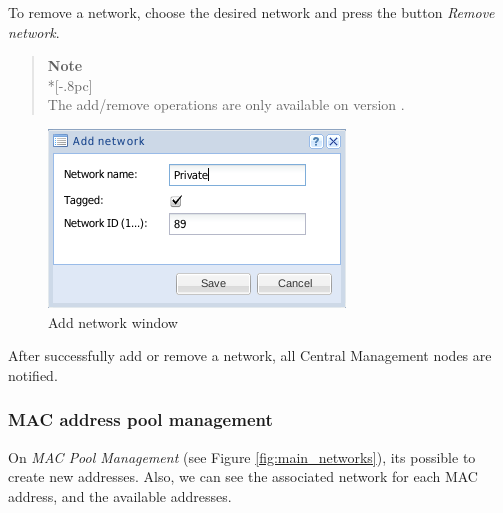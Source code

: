 To remove a network, choose the desired network and press the button \emph{Remove network}. 

\begin{quote}
	{\large \bf Note} \\*[-.8pc]
	\underline{\hspace{6in}} \\
    The add/remove operations are only available on version \acronym.
\end{quote}


\begin{figure}[H]
	\begin{center}
	\includegraphics[scale=0.5]{screenshots/network_create.png}
	\caption{Add network window}
	\label{fig:network_create}
	\end{center}
\end{figure}

After successfully add or remove a network, all Central Management nodes are notified.

\subsubsection{MAC address pool management}
\label{sec:mac_pool}

On \emph{MAC Pool Management} (see Figure \ref{fig:main_networks}), its possible to create new addresses.
Also, we can see the associated network for each MAC address, and the available addresses.

